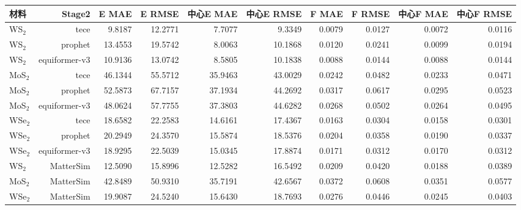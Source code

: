 \begin{tabular}{lrrrrrrrrr}
\toprule
材料 & Stage2 & E MAE & E RMSE & 中心E MAE & 中心E RMSE & F MAE & F RMSE & 中心F MAE & 中心F RMSE \\
\midrule
WS$_2$ & tece & 9.8187 & 12.2771 & 7.7077 & 9.3349 & 0.0079 & 0.0127 & 0.0072 & 0.0116 \\
WS$_2$ & prophet & 13.4553 & 19.5742 & 8.0063 & 10.1868 & 0.0120 & 0.0241 & 0.0099 & 0.0194 \\
WS$_2$ & equiformer-v3 & 10.9136 & 13.0742 & 8.5805 & 10.1838 & 0.0088 & 0.0144 & 0.0088 & 0.0144 \\
MoS$_2$ & tece & 46.1344 & 55.5712 & 35.9463 & 43.0029 & 0.0242 & 0.0482 & 0.0233 & 0.0471 \\
MoS$_2$ & prophet & 52.5873 & 67.7157 & 37.1934 & 44.2692 & 0.0317 & 0.0617 & 0.0295 & 0.0523 \\
MoS$_2$ & equiformer-v3 & 48.0624 & 57.7755 & 37.3803 & 44.6282 & 0.0268 & 0.0502 & 0.0264 & 0.0495 \\
WSe$_2$ & tece & 18.6582 & 22.2583 & 14.6161 & 17.4367 & 0.0163 & 0.0304 & 0.0158 & 0.0301 \\
WSe$_2$ & prophet & 20.2949 & 24.3570 & 15.5874 & 18.5376 & 0.0204 & 0.0358 & 0.0190 & 0.0337 \\
WSe$_2$ & equiformer-v3 & 18.9295 & 22.5039 & 15.0345 & 17.8874 & 0.0171 & 0.0312 & 0.0170 & 0.0312 \\
WS$_2$ & MatterSim & 12.5090 & 15.8996 & 12.5282 & 16.5492 & 0.0209 & 0.0420 & 0.0188 & 0.0389 \\
MoS$_2$ & MatterSim & 42.8489 & 50.9310 & 35.7191 & 42.6567 & 0.0372 & 0.0608 & 0.0351 & 0.0577 \\
WSe$_2$ & MatterSim & 19.9087 & 24.5240 & 15.6430 & 18.7693 & 0.0276 & 0.0446 & 0.0245 & 0.0403 \\
\bottomrule
\end{tabular}
